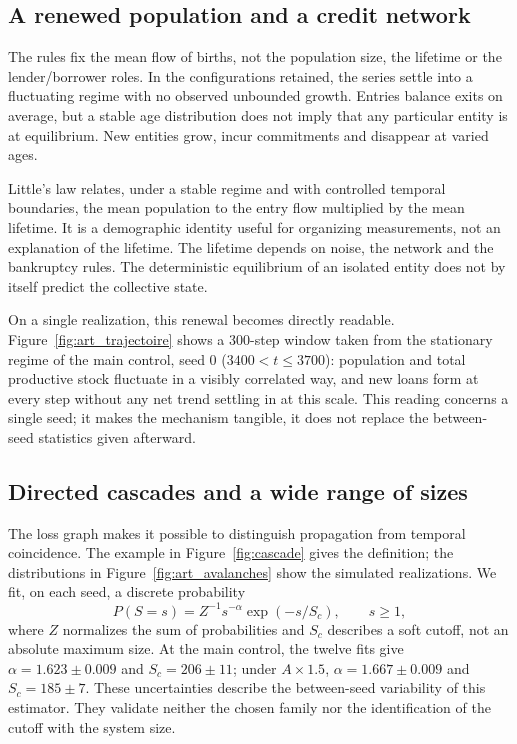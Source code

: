 \subsection{A renewed population and a credit network}
The rules fix the mean flow of births, not the population size, the
lifetime or the lender/borrower roles. In the configurations retained,
the series settle into a fluctuating regime with no observed unbounded
growth. Entries balance exits on average, but a stable age distribution
does not imply that any particular entity is at equilibrium. New
entities grow, incur commitments and disappear at varied ages.

Little's law relates, under a stable regime and with controlled
temporal boundaries, the mean population to the entry flow multiplied
by the mean lifetime. It is a demographic identity useful for
organizing measurements, not an explanation of the lifetime. The
lifetime depends on noise, the network and the bankruptcy rules. The
deterministic equilibrium of an isolated entity does not by itself
predict the collective state.

On a single realization, this renewal becomes directly readable.
Figure~\ref{fig:art_trajectoire} shows a 300-step window taken from the
stationary regime of the main control, seed 0 ($3400<t\le3700$):
population and total productive stock fluctuate in a visibly correlated
way, and new loans form at every step without any net trend settling in
at this scale. This reading concerns a single seed; it makes the
mechanism tangible, it does not replace the between-seed statistics
given afterward.


\subsection{Directed cascades and a wide range of sizes}
The loss graph makes it possible to distinguish propagation from
temporal coincidence. The example in Figure~\ref{fig:cascade} gives the
definition; the distributions in Figure~\ref{fig:art_avalanches} show
the simulated realizations. We fit, on each seed, a discrete
probability
\begin{equation}
 P(S=s)=Z^{-1}s^{-\alpha}\exp(-s/S_c),\qquad s\ge1,
 \label{eq:avalanche}
\end{equation}
where $Z$ normalizes the sum of probabilities and $S_c$ describes a
soft cutoff, not an absolute maximum size. At the main control, the
twelve fits give $\alpha=1.623\pm0.009$ and $S_c=206\pm11$; under
$A\times1.5$, $\alpha=1.667\pm0.009$ and $S_c=185\pm7$. These
uncertainties describe the between-seed variability of this estimator.
They validate neither the chosen family nor the identification of the
cutoff with the system size.

